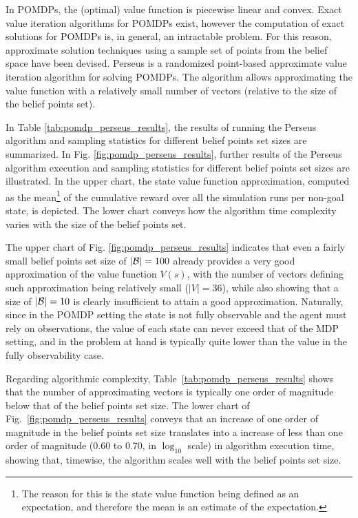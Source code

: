 \documentclass[a4paper]{article}
\begin{document}
In POMDPs, the (optimal) value function is piecewise linear and convex. Exact value iteration algorithms for POMDPs exist, however the computation of exact solutions for POMDPs is, in general, an intractable problem. For this reason, approximate solution techniques using a sample set of points from the belief space have been devised. Perseus is a randomized point-based approximate value iteration algorithm for solving POMDPs. The algorithm allows approximating the value function with a relatively small number of vectors (relative to the size of the belief points set).

In Table \ref{tab:pomdp_perseus_results}, the results of running the Perseus algorithm and sampling statistics for different belief points set sizes are summarized. In Fig. \ref{fig:pomdp_perseus_results}, further results of the Perseus algorithm execution and sampling statistics for different belief points set sizes are illustrated. In the upper chart, the state value function approximation, computed as the mean\footnote{The reason for this is the state value function being defined as an expectation, and therefore the mean is an estimate of the expectation.} of the cumulative reward over all the simulation runs per non-goal state, is depicted. The lower chart conveys how the algorithm time complexity varies with the size of the belief points set.

The upper chart of Fig. \ref{fig:pomdp_perseus_results} indicates that even a fairly small belief points set size of $| {\cal B} |=100$ already provides a very good approximation of the value function $V(s)$, with the number of vectors defining such approximation being relatively small ($| V |=36$), while also showing that a size of $| {\cal B} |=10$ is clearly insufficient to attain a good approximation. Naturally, since in the POMDP setting the state is not fully observable and the agent must rely on observations, the value of each state can never exceed that of the MDP setting, and in the problem at hand is typically quite lower than the value in the fully observability case.

Regarding algorithmic complexity, Table~\ref{tab:pomdp_perseus_results} shows that the number of approximating vectors is typically one order of magnitude below that of the belief points set size. The lower chart of Fig.~\ref{fig:pomdp_perseus_results} conveys that an increase of one order of magnitude in the belief points set size translates into a increase of less than one order of magnitude (0.60 to 0.70, in $\log_{10}$ scale) in algorithm execution time, showing that, timewise, the algorithm scales well with the belief points set size.
\end{document}
